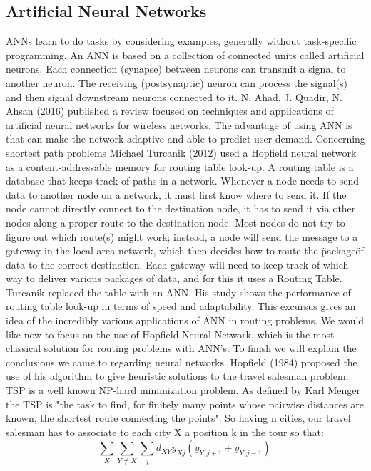 \subsection{Artificial Neural Networks}
ANNs learn to do tasks by considering examples, generally without task-specific 
programming. An ANN is based on a collection of connected units called artificial neurons. Each 
connection (synapse) between neurons can transmit a signal to another neuron. The receiving 
(postsynaptic) neuron can process the signal(s) and then signal downstream neurons connected to it.
\bigbreak
N. Ahad, J.  Quadir, N. Ahsan (2016) published a review focused on techniques and applications of 
artificial neural networks for wireless networks. The advantage of using ANN is that can make the 
network adaptive and able to predict user demand.
\bigbreak
Concerning shortest path problems Michael Turcanik (2012) used a Hopfield neural network as a 
content-addressable memory for routing table look-up.
A routing table is a database that keeps track of paths in a network. Whenever a node needs to send 
data to another node on a network, it must first know where to send it. If the node cannot directly 
connect to the destination node, it has to send it via other nodes along a proper route to the 
destination node. Most nodes do not try to figure out which route(s) might work; instead, a node will 
send the message to a gateway in the local area network, which then decides how to route the \"package\"
of data to the correct destination. Each gateway will need to keep track of which way to deliver 
various packages of data, and for this it uses a Routing Table. 
Turcanik replaced the table with an ANN. His study shows the performance of routing table look-up in 
terms of speed and adaptability.
\bigbreak
This excursus gives an idea of the incredibly various applications of ANN in routing problems.
We would like now to focus on the use of Hopfield Neural Network, which is the most classical solution 
for routing problems with ANN's. To finish we will explain the conclusions we came to regarding neural networks.
\bigbreak
Hopfield (1984) proposed the use of his algorithm to give heuristic solutions to the travel salesman 
problem.
TSP is a well known NP-hard minimization problem. As defined by Karl Menger the TSP is "the task to 
find, for finitely many points whose pairwise distances are known, the shortest route connecting the 
points". So having n cities, our travel salesman has to associate to each city X a position k in the 
tour so that: 
\begin{equation*}
    \sum_{X}\sum_{Y\neq X}\sum_{j}{d_{XY}y_{Xj}(y_{Y,j+1}+y_{Y,j-1})\ }
\end{equation*}
